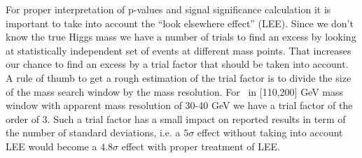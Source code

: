 For proper interpretation of p-values and signal significance
calculation it is important to take into account the ``look elsewhere
effect'' (LEE). Since we don't know the true Higgs mass we have a
number of trials to find an excess by looking at statistically
independent set of events at different mass points. That increases our
chance to find an excess by a trial factor that should be taken into
account. A rule of thumb to get a rough estimation of the trial factor
is to divide the size of the mass search window by the mass
resolution. For \WW\ in [110,200] GeV mass window with apparent mass
resolution of 30-40 GeV we have a trial factor of the order of 3. Such
a trial factor has a small impact on reported results in term of the
number of standard deviations, i.e. a $5\sigma$ effect without taking
into account LEE would become a $4.8\sigma$ effect with proper
treatment of LEE.
